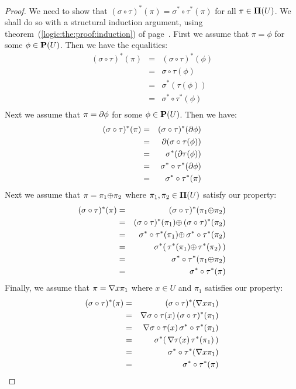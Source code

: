 \begin{proof}
We need to show that
$(\sigma\circ\tau)^{*}(\pi)=\sigma^{*}\circ\tau^{*}(\pi)$ for all
$\pi\in{\bf\Pi}(U)$. We shall do so with a structural induction
argument, using theorem~(\ref{logic:the:proof:induction}) of
page~\pageref{logic:the:proof:induction}. First we assume that
$\pi=\phi$ for some $\phi\in{\bf P}(U)$. Then we have the
equalities:
    \begin{eqnarray*}
    (\sigma\circ\tau)^{*}(\pi)&=&(\sigma\circ\tau)^{*}(\phi)\\
    &=&\sigma\circ\tau(\phi)\\
    &=&\sigma^{*}(\tau(\phi))\\
    &=&\sigma^{*}\circ\tau^{*}(\phi)\\
    \end{eqnarray*}
Next we assume that $\pi=\mbox{$\partial$}\phi$ for some $\phi\in{\bf P}(U)$.
Then we have:
    \begin{eqnarray*}
    (\sigma\circ\tau)^{*}(\pi)&=&(\sigma\circ\tau)^{*}(\mbox{$\partial$}\phi)\\
    &=&\mbox{$\partial$}(\sigma\circ\tau(\phi))\\
    &=&\sigma^{*}(\mbox{$\partial$}\tau(\phi))\\
    &=&\sigma^{*}\circ\tau^{*}(\mbox{$\partial$}\phi)\\
    &=&\sigma^{*}\circ\tau^{*}(\pi)\\
    \end{eqnarray*}
Next we assume that $\pi=\pi_{1}\mbox{$\oplus$}\pi_{2}$ where
$\pi_{1},\pi_{2}\in{\bf\Pi}(U)$ satisfy our property:
    \begin{eqnarray*}
    (\sigma\circ\tau)^{*}(\pi)&=&(\sigma\circ\tau)^{*}(\pi_{1}\mbox{$\oplus$}\pi_{2})\\
    &=&(\sigma\circ\tau)^{*}(\pi_{1})\mbox{$\oplus$}\,(\sigma\circ\tau)^{*}(\pi_{2})\\
    &=&\sigma^{*}\circ\tau^{*}(\pi_{1})\mbox{$\oplus$}\,\sigma^{*}\circ\tau^{*}(\pi_{2})\\
    &=&\sigma^{*}(\,\tau^{*}(\pi_{1})\mbox{$\oplus$}\,\tau^{*}(\pi_{2})\,)\\
    &=&\sigma^{*}\circ\tau^{*}(\pi_{1}\mbox{$\oplus$}\pi_{2})\\
    &=&\sigma^{*}\circ\tau^{*}(\pi)\\
    \end{eqnarray*}
Finally, we assume that $\pi=\mbox{$\nabla$} x\pi_{1}$ where $x\in U$ and
$\pi_{1}$ satisfies our property:
    \begin{eqnarray*}
    (\sigma\circ\tau)^{*}(\pi)&=&(\sigma\circ\tau)^{*}(\mbox{$\nabla$} x\pi_{1})\\
    &=&\mbox{$\nabla$} \sigma\circ\tau(x)\,(\sigma\circ\tau)^{*}(\pi_{1})\\
    &=&\mbox{$\nabla$} \sigma\circ\tau(x)\,\sigma^{*}\circ\tau^{*}(\pi_{1})\\
    &=&\sigma^{*}(\,\mbox{$\nabla$}\tau(x)\,\tau^{*}(\pi_{1})\,)\\
    &=&\sigma^{*}\circ\tau^{*}(\mbox{$\nabla$} x\pi_{1})\\
    &=&\sigma^{*}\circ\tau^{*}(\pi)\\
    \end{eqnarray*}
\end{proof}

